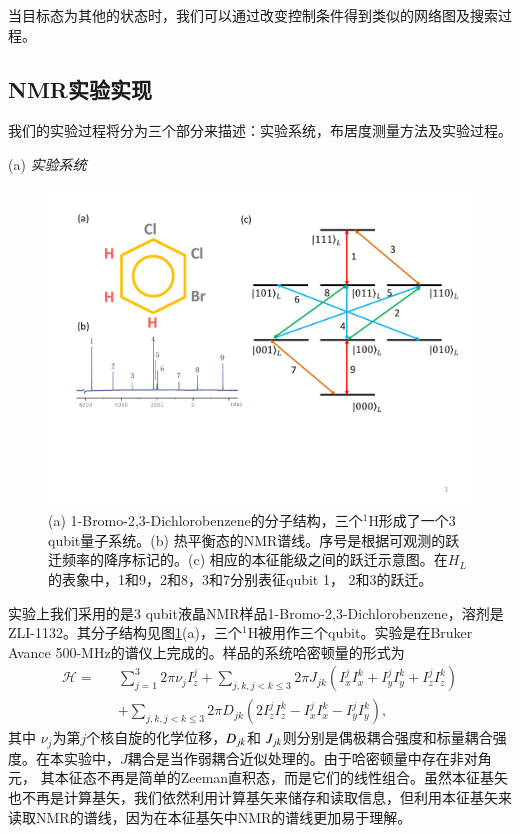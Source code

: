 当目标态为其他的状态时，我们可以通过改变控制条件得到类似的网络图及搜索过程。

\subsection{NMR实验实现}

我们的实验过程将分为三个部分来描述：实验系统，布居度测量方法及实验过程。

(a) \emph{实验系统}

\begin{figure}[htbp]
            \begin{center}
              \includegraphics[width= 0.8\columnwidth]{figures/rwsample.pdf}
              \caption{(a) 1-Bromo-2,3-Dichlorobenzene的分子结构，三个$^1$H形成了一个3 qubit量子系统。(b) 热平衡态的NMR谱线。序号是根据可观测的跃迁频率的降序标记的。(c) 相应的本征能级之间的跃迁示意图。在$H_L$的表象中，1和9，2和8，3和7分别表征qubit 1， 2和3的跃迁。 }
              \label{rwsample}
            \end{center}
 \end{figure}

实验上我们采用的是3 qubit液晶NMR样品1-Bromo-2,3-Dichlorobenzene，溶剂是ZLI-1132。其分子结构见图\ref{rwsample}(a)，三个$^1$H被用作三个qubit。实验是在Bruker
Avance 500-MHz的谱仪上完成的。样品的系统哈密顿量的形式为
\begin{eqnarray}\label{Hamiltonian}
\mathcal{H}=&&\sum\limits_{j=1}^3 {2\pi \nu _j } I_z^j  + \sum\limits_{j,k,j < k\leqslant 3} {2\pi} J_{jk} (I_x^j I_x^k  + I_y^j I_y^k+I_z^j I_z^k) \nonumber\\
&&+ \sum\limits_{j,k,j < k\leqslant 3} {2\pi} D_{jk} \left( {2I_z^j I_z^k  - I_x^j I_x^k  - I_y^j I_y^k } \right),
\end{eqnarray}
其中 $\nu_j$为第$j$个核自旋的化学位移，$\emph{D}_{jk}$和 $\emph{J}_{jk}$则分别是偶极耦合强度和标量耦合强度。在本实验中，$J$耦合是当作弱耦合近似处理的。由于哈密顿量中存在非对角元，
其本征态不再是简单的Zeeman直积态，而是它们的线性组合。虽然本征基矢也不再是计算基矢，我们依然利用计算基矢来储存和读取信息，但利用本征基矢来
读取NMR的谱线，因为在本征基矢中NMR的谱线更加易于理解。

